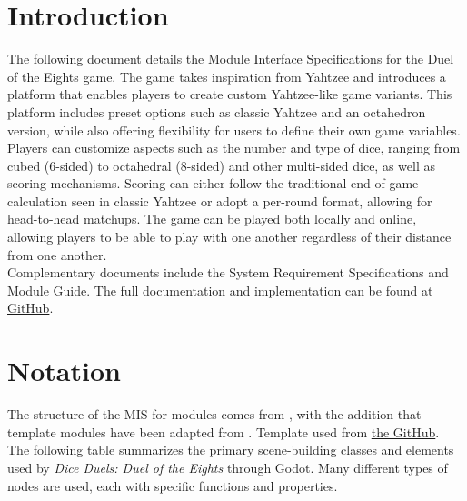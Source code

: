 \documentclass[12pt, titlepage]{article}
\begin{document}
\section{Introduction}

The following document details the Module Interface Specifications for the Duel of the Eights game. The game takes inspiration from Yahtzee and introduces a platform that enables players to create custom Yahtzee-like game variants. This platform includes preset options such as classic Yahtzee and an octahedron version, while also offering flexibility for users to define their own game variables. Players can customize aspects such as the number and type of dice, ranging from cubed (6-sided) to octahedral (8-sided) and other multi-sided dice, as well as scoring mechanisms. Scoring can either follow the traditional end-of-game calculation seen in classic Yahtzee or adopt a per-round format, allowing for head-to-head matchups. The game can be played both locally and online, allowing players to be able to play with one another regardless of their distance from one another.\\

Complementary documents include the System Requirement Specifications
and Module Guide.  The full documentation and implementation can be
found at \href{https://github.com/John-Popovici/duel-of-the-eights/tree/main}{GitHub}.

\newpage
\section{Notation}


The structure of the MIS for modules comes from \citet{HoffmanAndStrooper1995},
with the addition that template modules have been adapted from
\cite{GhezziEtAl2003}. Template used from \href{https://github.com/smiths/capTemplate}{the \progname GitHub}.\\

The following table summarizes the primary scene-building classes and elements used by \textit{Dice Duels: Duel of the Eights} through Godot. Many different types of nodes are used, each with specific functions and properties.
\end{document}
